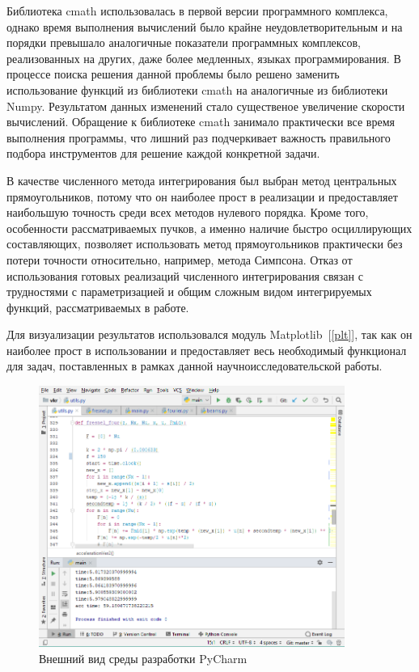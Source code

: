 {    Библиотека cmath использовалась в первой версии программного комплекса,
    однако время выполнения вычислений было крайне неудовлетворительным и на порядки превышало аналогичные показатели программных комплексов,
    реализованных на других, даже более медленных, языках программирования.
    В процессе поиска решения данной проблемы было решено заменить использование функций из библиотеки cmath на аналогичные из библиотеки Numpy.
    Результатом данных изменений стало существеное увеличение скорости вычислений.
    Обращение к библиотеке cmath занимало практически все время выполнения программы,
    что лишний раз подчеркивает важность правильного подбора инструментов для решение каждой конкретной задачи.

    В качестве численного метода интегрирования был выбран метод
    центральных прямоугольников, потому что он наиболее прост в реализации и
    предоставляет наибольшую точность среди всех методов нулевого порядка.
    Кроме того, особенности рассматриваемых пучков, а именно наличие быстро осциллирующих составляющих,
    позволяет использовать метод прямоугольников практически без потери точности относительно, например, метода Симпсона.
    Отказ от использования готовых реализаций численного интегрирования связан
    с трудностями с параметризацией и общим сложным видом интегрируемых
    функций, рассматриваемых в работе.

    Для визуализации результатов использовался модуль Matplotlib~[\ref{plt}],
    так как он наиболее прост в использовании и предоставляет весь
    необходимый функционал для задач, поставленных в рамках данной научноисследовательской работы.

    \begin{figure}[H]
        \begin{center}
            \includegraphics[width=10cm]{plots/pycharm1}
            \vspace{0.4cm}
            \caption{Внешний вид среды разработки PyCharm}
            \label{pycharm}
        \end{center}
    \end{figure}

}
